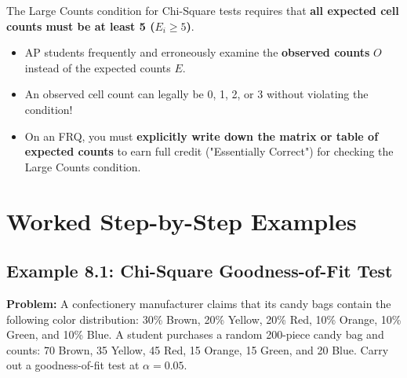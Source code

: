 \begin{trapbox}
The Large Counts condition for Chi-Square tests requires that \textbf{all expected cell counts must be at least 5 ($E_i \ge 5$)}.
\begin{itemize}
  \item AP students frequently and erroneously examine the \textbf{observed counts} $O$ instead of the expected counts $E$.
  \item An observed cell count can legally be 0, 1, 2, or 3 without violating the condition!
  \item On an FRQ, you must \textbf{explicitly write down the matrix or table of expected counts} to earn full credit ("Essentially Correct") for checking the Large Counts condition.
\end{itemize}
\end{trapbox}

\section{Worked Step-by-Step Examples}

\subsection*{Example 8.1: Chi-Square Goodness-of-Fit Test}
\textbf{Problem:} A confectionery manufacturer claims that its candy bags contain the following color distribution: 30\% Brown, 20\% Yellow, 20\% Red, 10\% Orange, 10\% Green, and 10\% Blue. A student purchases a random 200-piece candy bag and counts: 70 Brown, 35 Yellow, 45 Red, 15 Orange, 15 Green, and 20 Blue. Carry out a goodness-of-fit test at $\alpha = 0.05$.

